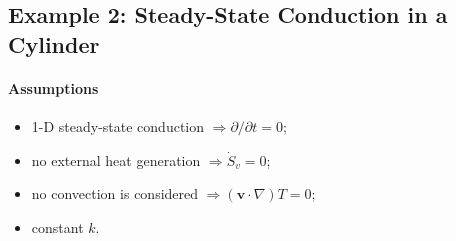 \documentclass[12pt, a4paper]{article}
\begin{document}
\subsection{Example 2: Steady-State Conduction in a Cylinder}
\begin{tcolorbox}[breakable, title = \textbf{Example: Conduction Through a Cylinder}]
\begin{minipage}{.6\textwidth}
    \paragraph{Assumptions} 
    \begin{itemize}
        \item 1-D steady-state conduction $\Rightarrow \partial / \partial t = 0$;
        \item no external heat generation $ \Rightarrow \dot{S}_{v} = 0$;
        \item no convection is considered $\Rightarrow (\bm{v} \cdot \nabla) T = 0$;
        \item constant $k$.
\end{itemize}


\end{minipage}
\end{tcolorbox}
\end{document}
